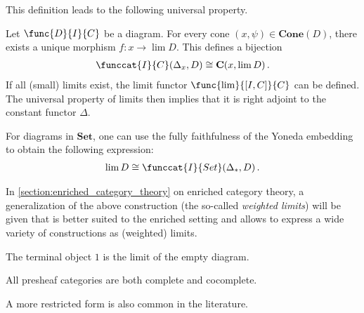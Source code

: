     This definition leads to the following universal property.
    \begin{uproperty}\label{cat:limit_uproperty}
        Let $\func{D}{I}{C}$ be a diagram. For every cone $(x,\psi)\in\mathbf{Cone}(D)$, there exists a unique morphism $f:x\rightarrow\lim D$. This defines a bijection
        \begin{gather}
            \funccat{I}{C}(\Delta_x,D)\cong\mathbf{C}(x,\lim D)\,.
        \end{gather}
        If all (small) limits exist, the limit functor $\func{\lim}{[I,C]}{C}$ can be defined. The universal property of limits then implies that it is right adjoint to the constant functor $\Delta$.

        For diagrams in $\mathbf{Set}$, one can use the fully faithfulness of the Yoneda embedding to obtain the following expression:
        \begin{gather}
            \lim D\cong\funccat{I}{Set}(\Delta_\ast,D)\,.
        \end{gather}
    \end{uproperty}
    \begin{remark}
        In \cref{section:enriched_category_theory} on enriched category theory, a generalization of the above construction (the so-called \textit{weighted limits}) will be given that is better suited to the enriched setting and allows to express a wide variety of constructions as (weighted) limits.
    \end{remark}

    \begin{example}
        The terminal object $1$ is the limit of the empty diagram.
    \end{example}

    \begin{example}\label{cat:complete_presheaf_category}
        All presheaf categories are both complete and cocomplete.
    \end{example}

    A more restricted form is also common in the literature.

